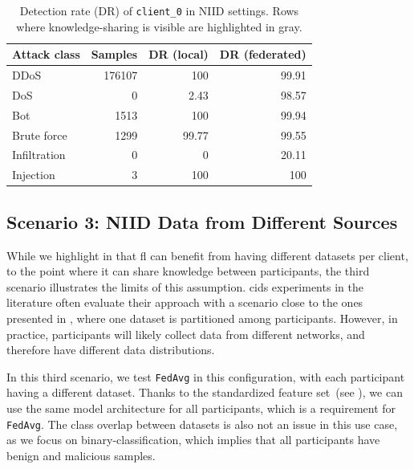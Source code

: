 \begin{table}
    \centering
    \caption{Detection rate (DR) of \texttt{client\_0} in NIID settings. Rows where knowledge-sharing is visible are highlighted in gray.}
    \label{tbl:niidclient}
    \begin{tabular}{l|rrr}
        \toprule
        \textbf{Attack class} & \textbf{Samples} & \textbf{DR (local)} & \textbf{DR (federated)} \\
        \midrule
        DDoS & 176107 & 100 & 99.91 \\
        \rowcolor{lightgray} DoS & 0 & 2.43 & 98.57 \\
        Bot & 1513 & 100 & 99.94 \\
        Brute force & 1299 & 99.77 & 99.55 \\
        \rowcolor{lightgray} Infiltration & 0 & 0 & 20.11 \\
        Injection & 3 & 100 & 100 \\
        \bottomrule
    \end{tabular}
\end{table}



\subsection{Scenario 3: NIID Data from Different Sources\label{sec:app.demo.heterogeneous}}

While we highlight in  that \gls{fl} can benefit from having different datasets per client, to the point where it can share knowledge between participants, the third scenario illustrates the limits of this assumption.
\Gls{cids} experiments in the literature often evaluate their approach with a scenario close to the ones presented in , where one dataset is partitioned among participants.
However, in practice, participants will likely collect data from different networks, and therefore have different data distributions.

In this third scenario, we test \texttt{FedAvg} in this configuration, with each participant having a different dataset.
Thanks to the standardized feature set~(see ), we can use the same model architecture for all participants, which is a requirement for \texttt{FedAvg}.
The class overlap between datasets is also not an issue in this use case, as we focus on binary-classification, which implies that all participants have benign and malicious samples.

